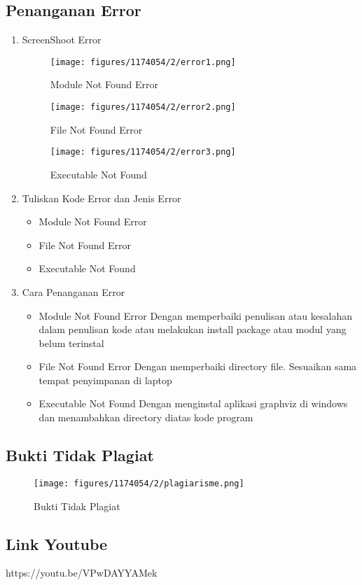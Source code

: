 \subsection{Penanganan Error}
\begin{enumerate}
\item ScreenShoot Error
	\begin{figure}[H]
		\texttt{[image: figures/1174054/2/error1.png]}
		\centering
		\caption{Module Not Found Error}
	\end{figure}
	\begin{figure}[H]
		\texttt{[image: figures/1174054/2/error2.png]}
		\centering
		\caption{File Not Found Error}
	\end{figure}
	\begin{figure}[H]
		\texttt{[image: figures/1174054/2/error3.png]}
		\centering
		\caption{Executable Not Found}
	\end{figure}

	\item Tuliskan Kode Error dan Jenis Error
	\begin{itemize}
		\item Module Not Found Error
		\item File Not Found Error
		\item Executable Not Found
	\end{itemize}
	\item Cara Penanganan Error
	\begin{itemize}
		\item Module Not Found Error
		\hfill\break
		Dengan memperbaiki penulisan atau kesalahan dalam penulisan kode atau melakukan install package atau modul yang belum terinstal
		\item File Not Found Error
		\hfill\break
		Dengan memperbaiki directory file. Sesuaikan sama tempat penyimpanan di laptop
		\item Executable Not Found
		\hfill\break
		Dengan menginstal aplikasi graphviz di windows dan menambahkan directory diatas kode program
	\end{itemize}
\end{enumerate}

\subsection{Bukti Tidak Plagiat}
\begin{figure}[H]
	\texttt{[image: figures/1174054/2/plagiarisme.png]}
	\centering
	\caption{Bukti Tidak Plagiat}
\end{figure}

\subsection{Link Youtube}
https://youtu.be/VPwDAYYAMek
